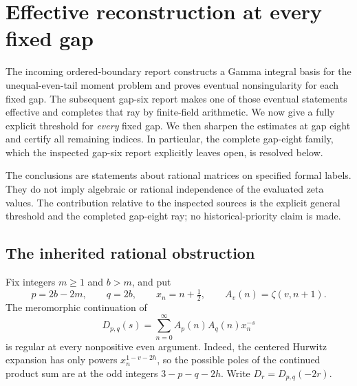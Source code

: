 
\section{Effective reconstruction at every fixed gap}
\label{eg:section}

The incoming ordered-boundary report \cite{OrderedIncoming} constructs a Gamma integral basis
for the unequal-even-tail moment problem and proves eventual
nonsingularity for each fixed gap.  The subsequent gap-six report \cite{GapSix}
makes one of those eventual statements effective and completes that
ray by finite-field arithmetic.  We now give a fully explicit threshold
for \emph{every} fixed gap.  We then sharpen the estimates at gap eight
and certify all remaining indices.  In particular, the complete
gap-eight family, which the inspected gap-six report explicitly leaves
open, is resolved below.

The conclusions are statements about rational matrices on specified
formal labels.  They do not imply algebraic or rational independence
of the evaluated zeta values.  The contribution relative to the
inspected sources is the explicit general threshold and the completed
gap-eight ray; no historical-priority claim is made.

\subsection{The inherited rational obstruction}

Fix integers $m\ge1$ and $b>m$, and put
\[
 p=2b-2m,\qquad q=2b,\qquad x_n=n+\tfrac12,
 \qquad A_v(n)=\zeta(v,n+1).
\]
The meromorphic continuation of
\[
 D_{p,q}(s)=\sum_{n=0}^{\infty}A_p(n)A_q(n)x_n^{-s}
\]
is regular at every nonpositive even argument.  Indeed, the centered
Hurwitz expansion has only powers $x_n^{1-v-2h}$, so the possible
poles of the continued product sum are at the odd integers
$3-p-q-2h$.  Write $D_r=D_{p,q}(-2r)$.

